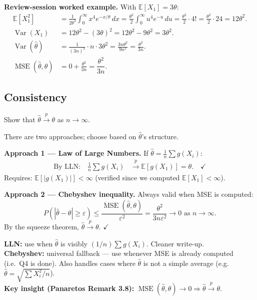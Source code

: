 \documentclass[11pt,a4paper]{article}
\newcommand{\E}{\mathbb{E}}
\newcommand{\Var}{\operatorname{Var}}
\newcommand{\MSE}{\operatorname{MSE}}
\newcommand{\convp}{\xrightarrow{\,p\,}}
\begin{document}
\textbf{Review-session worked example.} With $\E[X_1]=3\theta$:
\begin{align*}
  \E[X_1^2] &= \frac{1}{2\theta^3}\int_0^\infty x^4 e^{-x/\theta}\,dx
  = \frac{\theta^2}{2}\int_0^\infty u^4 e^{-u}\,du = \frac{\theta^2}{2}\cdot 4! = \frac{\theta^2}{2}\cdot 24 = 12\theta^2.\\
  \Var(X_1) &= 12\theta^2 - (3\theta)^2 = 12\theta^2 - 9\theta^2 = 3\theta^2.\\
  \Var(\hat\theta) &= \frac{1}{(3n)^2}\cdot n \cdot 3\theta^2 = \frac{3n\theta^2}{9n^2} = \frac{\theta^2}{3n}.\\
  \MSE(\hat\theta,\theta) &= 0 + \frac{\theta^2}{3n} = \boxed{\dfrac{\theta^2}{3n}}.
\end{align*}

\subsection{Consistency}

\begin{tcolorbox}[questionbox, title={Question 5}]
Show that $\hat\theta \convp \theta$ as $n\to\infty$.
\end{tcolorbox}

There are two approaches; choose based on $\hat\theta$'s structure.

\textbf{Approach 1 — Law of Large Numbers.} If $\hat\theta = \frac{1}{n}\sum g(X_i)$:
\begin{align*}
  \text{By LLN:}\quad \frac{1}{n}\sum g(X_i) &\convp \E[g(X_1)] = \theta. \quad\checkmark
\end{align*}
Requires: $\E[|g(X_1)|] < \infty$ (verified since we computed $\E[X_1] < \infty$).

\textbf{Approach 2 — Chebyshev inequality.} Always valid when MSE is computed:
\[
  P(|\hat\theta - \theta| \geq \varepsilon) \leq \frac{\MSE(\hat\theta,\theta)}{\varepsilon^2} = \frac{\theta^2}{3n\varepsilon^2} \to 0 \text{ as } n\to\infty.
\]
By the squeeze theorem, $\hat\theta \convp \theta$. $\checkmark$

\begin{tcolorbox}[infobox, title={When to use each approach}]
\textbf{LLN:} use when $\hat\theta$ is visibly $(1/n)\sum g(X_i)$. Cleaner write-up.\\
\textbf{Chebyshev:} universal fallback — use whenever MSE is already computed (i.e.\ Q4 is done). Also handles cases where $\hat\theta$ is not a simple average (e.g.\ $\hat\theta = \sqrt{\sum X_i^2/n}$).\\
\textbf{Key insight (Panaretos Remark 3.8):} $\MSE(\hat\theta,\theta)\to 0 \Rightarrow \hat\theta\convp\theta$.
\end{tcolorbox}
\end{document}
